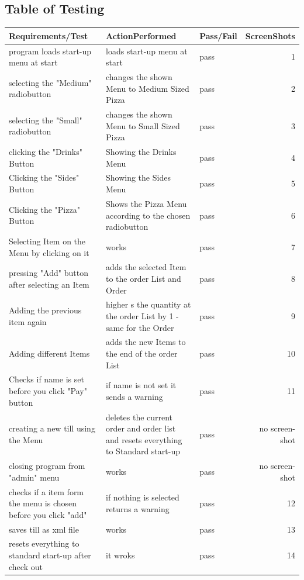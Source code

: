 \documentclass[11pt,a4paper]{article}
\begin{document}
\begin{flushleft}
\section{Table of Testing}


\begin{longtable}{|p{2.5cm}|p{2.5cm}|p{2.5cm}|r|}
\hline
Requirements/Test & ActionPerformed & Pass/Fail & \multicolumn{1}{l|}{ScreenShots} \\ \hline
program loads start-up menu at start & loads start-up menu at start & pass & 1 \\ \hline
selecting the "Medium" radiobutton & changes the shown Menu to Medium Sized Pizza & pass & 2 \\ \hline
selecting the "Small" radiobutton  & changes the shown Menu to Small Sized Pizza & pass & 3 \\ \hline
clicking the "Drinks" Button & Showing the Drinks Menu & pass & 4 \\ \hline
Clicking the "Sides" Button & Showing the Sides Menu & pass & 5 \\ \hline
Clicking the "Pizza" Button & Shows the Pizza Menu according to the chosen radiobutton & pass & 6 \\ \hline
Selecting Item on the Menu by clicking on it & works & pass & 7 \\ \hline
pressing "Add" button after selecting an Item & adds the selected Item to the order List and Order & pass & 8 \\ \hline
Adding the previous item again & higher s the quantity at the order List by 1 - same for the Order & pass & 9 \\ \hline
Adding different Items & adds the new Items to the end of the order List & pass & 10 \\ \hline
Checks if name is set before you click "Pay" button & if name is not set it sends a warning & pass & 11 \\ \hline
creating a new till using the Menu & deletes the current order and order list and resets everything to Standard start-up & pass & no screen-shot \\ \hline
closing program from "admin" menu & works & pass & no screen-shot \\ \hline
checks if a item form the menu is chosen before you click "add" & if nothing is selected returns a warning & pass & 12 \\ \hline
saves till as xml file & works & pass & 13 \\ \hline
resets everything to standard start-up after check out & it wroks & pass & 14 \\ \hline

\end{longtable}
\end{flushleft}
\end{document}
